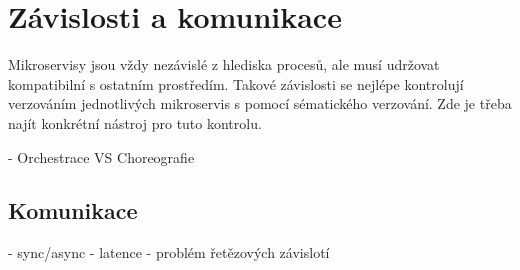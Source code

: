 
\section{Závislosti a komunikace}

Mikroservisy jsou vždy nezávislé z hlediska procesů, ale musí udržovat kompatibilní  s ostatním prostředím.
Takové závislosti se nejlépe kontrolují verzováním jednotlivých mikroservis s pomocí sématického verzování.
Zde je třeba najít konkrétní nástroj pro tuto kontrolu.


- Orchestrace VS Choreografie

\subsection{Komunikace}
- sync/async
- latence
- problém řetězových závislotí
